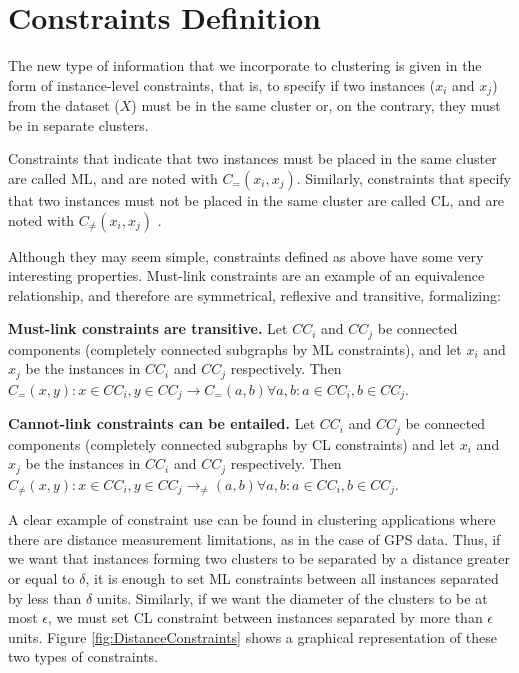 \section{Constraints Definition}

The new type of information that we incorporate to clustering is given in the form of instance-level constraints, that is, to specify if two instances ($x_i$ and $x_j$) from the dataset ($X$) must be in the same cluster or, on the contrary, they must be in separate clusters.

Constraints that indicate that two instances must be placed in the same cluster are called \acf{ML}, and are noted with $C_=(x_i,x_j)$. Similarly, constraints that specify that two instances must not be placed in the same cluster are called \acf{CL}, and are noted with $C_\neq(x_i,x_j)$ \cite{wagstaff2000clustering}.

Although they may seem simple, constraints defined as above have some very interesting properties. Must-link constraints are an example of an equivalence relationship, and therefore are symmetrical, reflexive and transitive, formalizing:

\begin{observation}
	\textbf{Must-link constraints are transitive.} Let $CC_i$ and $CC_j$ be connected components (completely connected subgraphs by \acs{ML} constraints), and let $x_i$ and $x_j$ be the instances in $CC_i$ and $CC_j$ respectively. Then $C_=(x,y): x \in CC_i, y \in CC_j \rightarrow C_=(a,b) \forall a,b: a\in CC_i, b \in CC_j$. \cite{davidson2007survey}
\end{observation}

\begin{observacion}
	\textbf{Cannot-link constraints can be entailed.} Let $CC_i$ and $CC_j$ be connected components (completely connected subgraphs by \acs{CL} constraints) and let $x_i$ and $x_j$ be the instances in $CC_i$ and $CC_j$ respectively. Then $C_\neq(x,y): x \in CC_i, y \in CC_j \rightarrow _\neq(a,b) \forall a,b: a\in CC_i, b \in CC_j$. \cite{davidson2007survey}
\end{observacion}

A clear example of constraint use can be found in clustering applications where there are distance measurement limitations, as in the case of GPS data. Thus, if we want that instances forming two clusters to be separated by a distance greater or equal to $\delta$, it is enough to set \acs{ML} constraints between all instances separated by less than $\delta$ units. Similarly, if we want the diameter of the clusters to be at most $\epsilon$, we must set \acs{CL} constraint between instances separated by more than $\epsilon$ units. Figure \ref{fig:DistanceConstraints} shows a graphical representation of these two types of constraints.

